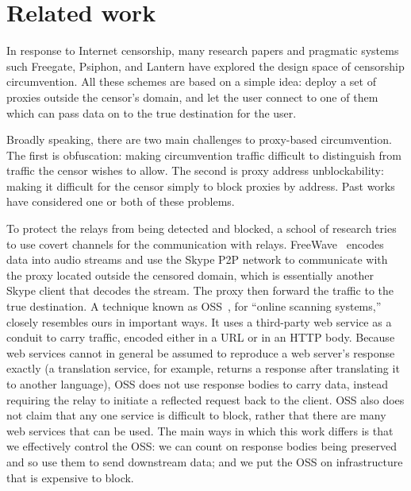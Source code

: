 \documentclass{article}
\begin{document}

\section{Related work}

In response to Internet censorship, many research papers and pragmatic systems
such Freegate, Psiphon, and Lantern have explored the design space of censorship
circumvention. All these schemes are based on a simple idea: deploy a set of
proxies outside the censor's domain, and let the user connect to one of them
which can pass data on to the true destination for the user.

Broadly speaking, there are two main challenges to proxy-based circumvention.
The first is obfuscation: making circumvention traffic difficult to distinguish
from traffic the censor wishes to allow. The second is proxy address
unblockability: making it difficult for the censor simply to block proxies by
address. Past works have considered one or both of these problems.

To protect the relays from being detected and blocked, a school of research
tries to use covert channels for the communication with relays. FreeWave~\cite{freewave}
encodes data into audio streams and use the Skype P2P network to communicate
with the proxy located outside the censored domain, which is essentially another
Skype client that decodes the stream. The proxy then forward the traffic to the
true destination. A technique known as OSS~\cite{oss}, for ``online scanning
systems,'' closely resembles ours in important ways. It uses a third-party web
service as a conduit to carry traffic, encoded either in a URL or in an HTTP
body. Because web services cannot in general be assumed to reproduce a web
server's response exactly (a translation service, for example, returns a
response after translating it to another language), OSS does not use response
bodies to carry data, instead requiring the relay to initiate a reflected
request back to the client. OSS also does not claim that any one service is
difficult to block, rather that there are many web services that can be used.
The main ways in which this work differs is that we effectively control the OSS:
we can count on response bodies being preserved and so use them to send
downstream data; and we put the OSS on infrastructure that is expensive to
block.
\end{document}
